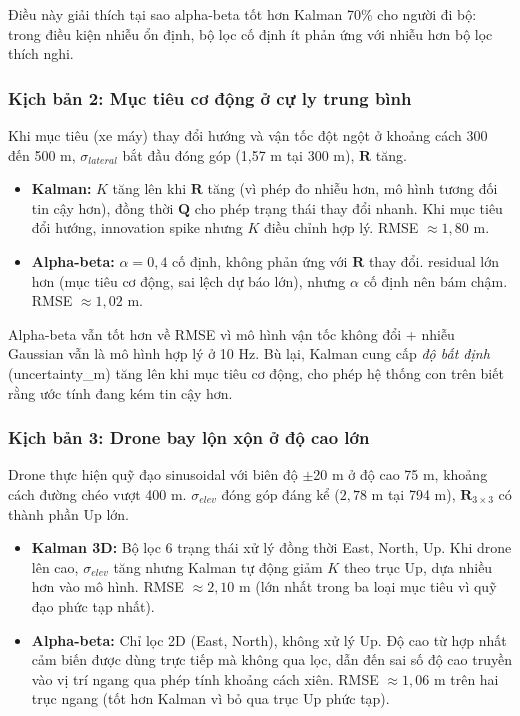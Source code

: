 Điều này giải thích tại sao alpha-beta tốt hơn Kalman 70\% cho người đi bộ: trong điều kiện nhiễu ổn định, bộ lọc cố định ít phản ứng với nhiễu hơn bộ lọc thích nghi.

\subsubsection{Kịch bản 2: Mục tiêu cơ động ở cự ly trung bình}

\hspace{0.5cm} Khi mục tiêu (xe máy) thay đổi hướng và vận tốc đột ngột ở khoảng cách 300 đến 500 m, $\sigma_{lateral}$ bắt đầu đóng góp (1,57 m tại 300 m), $\mathbf{R}$ tăng.

\begin{itemize}
    \item \textbf{Kalman:} $K$ tăng lên khi $\mathbf{R}$ tăng (vì phép đo nhiễu hơn, mô hình tương đối tin cậy hơn), đồng thời $\mathbf{Q}$ cho phép trạng thái thay đổi nhanh. Khi mục tiêu đổi hướng, innovation spike nhưng $K$ điều chỉnh hợp lý. RMSE $\approx 1{,}80$ m.
    \item \textbf{Alpha-beta:} $\alpha = 0{,}4$ cố định, không phản ứng với $\mathbf{R}$ thay đổi. residual lớn hơn (mục tiêu cơ động, sai lệch dự báo lớn), nhưng $\alpha$ cố định nên bám chậm. RMSE $\approx 1{,}02$ m.
\end{itemize}

Alpha-beta vẫn tốt hơn về RMSE vì mô hình vận tốc không đổi + nhiễu Gaussian vẫn là mô hình hợp lý ở 10 Hz. Bù lại, Kalman cung cấp \textit{độ bất định} (uncertainty\_m) tăng lên khi mục tiêu cơ động, cho phép hệ thống con trên biết rằng ước tính đang kém tin cậy hơn.

\subsubsection{Kịch bản 3: Drone bay lộn xộn ở độ cao lớn}

\hspace{0.5cm} Drone thực hiện quỹ đạo sinusoidal với biên độ $\pm$20 m ở độ cao 75 m, khoảng cách đường chéo vượt 400 m. $\sigma_{elev}$ đóng góp đáng kể ($2{,}78$ m tại 794 m), $\mathbf{R}_{3\times3}$ có thành phần Up lớn.

\begin{itemize}
    \item \textbf{Kalman 3D:} Bộ lọc 6 trạng thái xử lý đồng thời East, North, Up. Khi drone lên cao, $\sigma_{elev}$ tăng nhưng Kalman tự động giảm $K$ theo trục Up, dựa nhiều hơn vào mô hình. RMSE $\approx 2{,}10$ m (lớn nhất trong ba loại mục tiêu vì quỹ đạo phức tạp nhất).
    \item \textbf{Alpha-beta:} Chỉ lọc 2D (East, North), không xử lý Up. Độ cao từ hợp nhất cảm biến được dùng trực tiếp mà không qua lọc, dẫn đến sai số độ cao truyền vào vị trí ngang qua phép tính khoảng cách xiên. RMSE $\approx 1{,}06$ m trên hai trục ngang (tốt hơn Kalman vì bỏ qua trục Up phức tạp).
\end{itemize}

